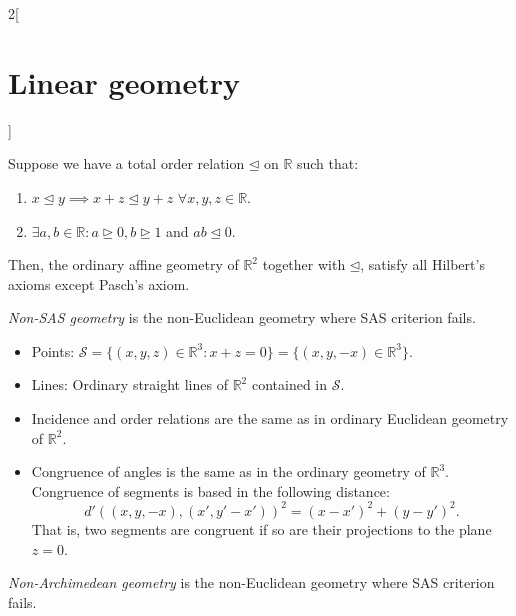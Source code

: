 \documentclass[../../../main.tex]{subfiles}
\begin{document}
\begin{multicols}{2}[\section{Linear geometry}]
\begin{definition}
\end{definition}
\begin{prop}
Suppose we have a total order relation $\unlhd$ on $\mathbb{R}$ such that:
\begin{enumerate}
    \item $x\unlhd y\implies x+z\unlhd y+z$ $\forall x,y,z\in\mathbb{R}$.
    \item $\exists a,b\in\mathbb{R}: a\unrhd 0, b\unrhd 1$ and $ab\unlhd 0$.
\end{enumerate}
Then, the ordinary affine geometry of $\mathbb{R}^2$ together with $\unlhd$, satisfy all Hilbert's axioms except Pasch's axiom.
\end{prop}
\begin{definition}
\textit{Non-SAS geometry} is the non-Euclidean geometry where SAS criterion fails.
\end{definition}
\begin{prop}
\hfill
\begin{itemize}
    \item Points: $\mathcal{S}=\{(x,y,z)\in\mathbb{R}^3:x+z=0\}=\{(x,y,-x)\in\mathbb{R}^3\}$.
    \item Lines: Ordinary straight lines of $\mathbb{R}^2$ contained in $\mathcal{S}$.
    \item Incidence and order relations are the same as in ordinary Euclidean geometry of $\mathbb{R}^2$.
    \item Congruence of angles is the same as in the ordinary geometry of $\mathbb{R}^3$. Congruence of segments is based in the following distance:  $$d'((x,y,-x),(x',y'-x'))^2=(x-x')^2+(y-y')^2.$$ That is, two segments are congruent if so are their projections to the plane $z=0$.
\end{itemize}
\end{prop}
\begin{definition}
\textit{Non-Archimedean geometry} is the non-Euclidean geometry where SAS criterion fails.
\end{definition}

\end{multicols}
\end{document}
